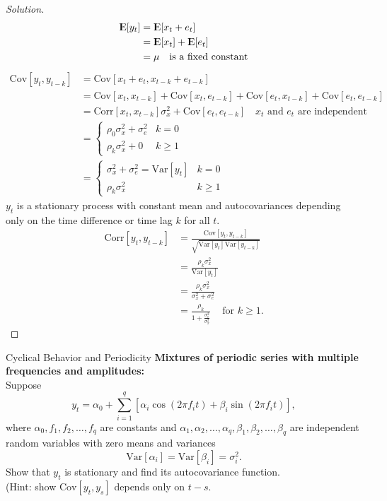 \documentclass[UTF8,a4paper,14pt]{ctexart}
\newcommand{\E}{{\rm I\kern-.3em E}}
\newcommand{\Var}{\mathrm{Var}}
\newcommand{\Cov}{\mathrm{Cov}}
\newcommand{\Corr}{\mathrm{Corr}}
\newenvironment{solution}
  {\renewcommand\qedsymbol{$\blacksquare$}\begin{proof}[Solution]}
  {\end{proof}}
\theoremstyle{definition}
\theoremstyle{remark}
\begin{document}
\begin{solution}
    \begin{align*}
        \E[y_t] &=\E[x_t + e_t] \\
        &=\E[x_t]+\E[e_t]\\
        &= \mu \quad\text{is a fixed constant}
    \end{align*}
    \begin{align*}
        \Cov[y_t,y_{t-k}] &= \Cov[x_t + e_t,x_{t-k} + e_{t-k}] \\
        &=\Cov[x_t,x_{t-k}]+\Cov[x_t , e_{t-k}]+\Cov[e_t,x_{t-k}]+\Cov[e_t, e_{t-k}]\\
        &=\Corr[x_t,x_{t-k}]\sigma_x^2+\Cov[e_t, e_{t-k}]\quad \text{$x_t$ and $e_t$ are independent}\\
        &=\begin{cases}
            \rho_0\sigma_x^2+\sigma_e^2  &k = 0\\
            \rho_k\sigma_x^2+0 &k\geq 1
        \end{cases}\\
        &=\begin{cases}
            \sigma_x^2+\sigma_e^2 = \Var[y_t] &k = 0\\
            \rho_k\sigma_x^2 &k\geq 1
        \end{cases}
    \end{align*}
    $y_t$ is a stationary process with constant mean and autocovariances depending only on the time difference
    or time lag $k$ for all $t$.
    \pagebreak
    \begin{align*}
        \Corr[y_t,y_{t-k}] &= \frac{\Cov[y_t,y_{t-k}]}{\sqrt{\Var[y_t]\Var[y_{t-k}]}}\\
        &=\frac{\rho_k\sigma_x^2}{\Var[y_t]}\\
        &=\frac{\rho_k\sigma_x^2}{\sigma_x^2+\sigma_e^2}\\
        &=\frac{\rho_k}{1 + \frac{\sigma_e^2}{\sigma_x^2}}\,\quad \text{for } k \geq 1.
    \end{align*}
    
\end{solution}

\pagebreak
\begin{Problem}{Cyclical Behavior and Periodicity}
    \textbf{Mixtures of periodic series with
    multiple frequencies and amplitudes:}\\
    Suppose 
    \[y_t = \alpha_0 + \sum_{i=1}^q \left[\alpha_i \cos(2\pi f_i t) + \beta_i \sin(2\pi f_i t)\right],\]
where 
$\alpha_0, f_1, f_2, \ldots, f_q$ are constants and $\alpha_1, \alpha_2, \ldots, \alpha_q, \beta_1, \beta_2,\ldots, \beta_q$ are independent random variables with zero means and variances 
\[\Var[\alpha_i] = \Var[\beta_i] = \sigma_i^2.\]
Show that $y_t$ is stationary and find its autocovariance function.\\
(Hint: show \(\Cov[y_t, y_s]\) depends only on $t - s$.
\end{Problem}
\end{document}
